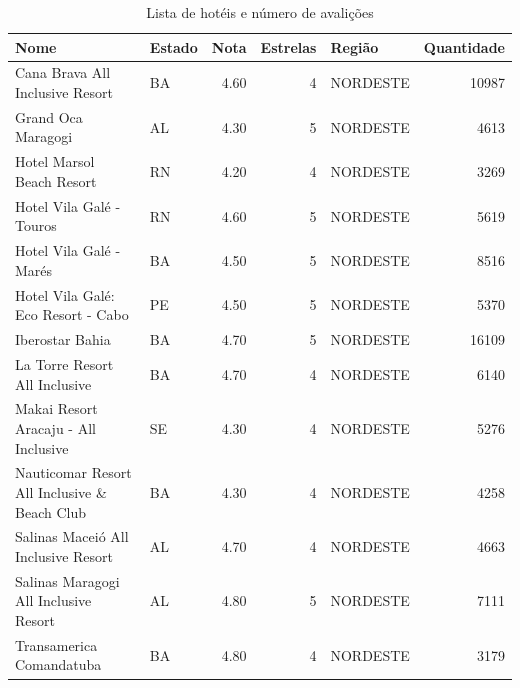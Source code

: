 \begin{table}[]
	\begin{tabular}{|p{5cm}|l|r|r|l|r|}
		\hline
		\textbf{Nome}                                 & \textbf{Estado} & \textbf{Nota} & \textbf{Estrelas} & \textbf{Região} & \textbf{Quantidade} \\\hline

		Cana Brava All Inclusive Resort               & BA              & 4.60          & 4                 & NORDESTE        & 10987               \\\hline
		Grand Oca Maragogi                            & AL              & 4.30          & 5                 & NORDESTE        & 4613                \\\hline
		Hotel Marsol Beach Resort                     & RN              & 4.20          & 4                 & NORDESTE        & 3269                \\\hline
		Hotel Vila Galé - Touros                      & RN              & 4.60          & 5                 & NORDESTE        & 5619                \\\hline
		Hotel Vila Galé - Marés                       & BA              & 4.50          & 5                 & NORDESTE        & 8516                \\\hline
		Hotel Vila Galé: Eco Resort - Cabo            & PE              & 4.50          & 5                 & NORDESTE        & 5370                \\\hline
		Iberostar Bahia                               & BA              & 4.70          & 5                 & NORDESTE        & 16109               \\\hline
		La Torre Resort All Inclusive                 & BA              & 4.70          & 4                 & NORDESTE        & 6140                \\\hline
		Makai Resort Aracaju - All Inclusive          & SE              & 4.30          & 4                 & NORDESTE        & 5276                \\\hline
		Nauticomar Resort All Inclusive \& Beach Club & BA              & 4.30          & 4                 & NORDESTE        & 4258                \\\hline
		Salinas Maceió All Inclusive Resort           & AL              & 4.70          & 4                 & NORDESTE        & 4663                \\\hline
		Salinas Maragogi All Inclusive Resort         & AL              & 4.80          & 5                 & NORDESTE        & 7111                \\\hline
		Transamerica Comandatuba                      & BA              & 4.80          & 4                 & NORDESTE        & 3179                \\\hline
	\end{tabular}%
	\caption{Lista de hotéis e número de avalições}
	\label{table:lista_hoteis}
\end{table}

